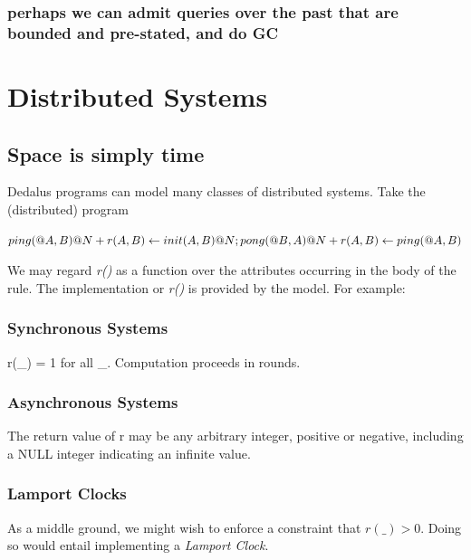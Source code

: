 \documentclass{acm_proc_article-sp-sigmod09}
\begin{document}
\subsubsection{perhaps we can admit queries over the past that are bounded and pre-stated, and do GC}


\section{Distributed Systems}

\subsection{Space is simply time}

Dedalus programs can model many classes of distributed systems.  Take the (distributed) program

$
ping(@A, B)@N + r(A, B) \leftarrow \\
init(A, B)@N; \\
\\
pong(@B, A)@N + r(A, B) \leftarrow \\
ping(@A, B)
$

We may regard  \emph{r()} as a function over the attributes occurring in the body of the rule.  The implementation or \emph{r()} is provided by
the model.  For example:

\subsubsection{Synchronous Systems}

r(\_) = 1 for all \_.  Computation proceeds in rounds.

\subsubsection{Asynchronous Systems}

The return value of r may be any arbitrary integer, positive or negative, including a NULL integer indicating an infinite value.

\subsubsection{Lamport Clocks}

As a middle ground, we might wish to enforce a constraint that $r(\_) > 0$.  Doing so would entail implementing a \emph{Lamport Clock}.
\end{document}
